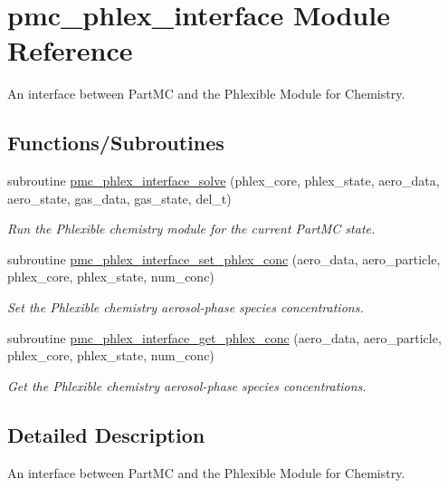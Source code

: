 \hypertarget{namespacepmc__phlex__interface}{}\section{pmc\+\_\+phlex\+\_\+interface Module Reference}
\label{namespacepmc__phlex__interface}


An interface between Part\+MC and the Phlexible Module for Chemistry.  


\subsection*{Functions/\+Subroutines}
\begin{DoxyCompactItemize}
\item 
subroutine \mbox{\hyperlink{namespacepmc__phlex__interface_aa62d09e99d1e6d81cd9ab31e4fec3db4}{pmc\+\_\+phlex\+\_\+interface\+\_\+solve}} (phlex\+\_\+core, phlex\+\_\+state, aero\+\_\+data, aero\+\_\+state, gas\+\_\+data, gas\+\_\+state, del\+\_\+t)
\begin{DoxyCompactList}\small\item\em Run the Phlexible chemistry module for the current Part\+MC state. \end{DoxyCompactList}\item 
subroutine \mbox{\hyperlink{namespacepmc__phlex__interface_a856f9c1fb3526353bd573ab1e4a5ae5f}{pmc\+\_\+phlex\+\_\+interface\+\_\+set\+\_\+phlex\+\_\+conc}} (aero\+\_\+data, aero\+\_\+particle, phlex\+\_\+core, phlex\+\_\+state, num\+\_\+conc)
\begin{DoxyCompactList}\small\item\em Set the Phlexible chemistry aerosol-\/phase species concentrations. \end{DoxyCompactList}\item 
subroutine \mbox{\hyperlink{namespacepmc__phlex__interface_a40607ba7c1278c70d004bbcdef0cc4d1}{pmc\+\_\+phlex\+\_\+interface\+\_\+get\+\_\+phlex\+\_\+conc}} (aero\+\_\+data, aero\+\_\+particle, phlex\+\_\+core, phlex\+\_\+state, num\+\_\+conc)
\begin{DoxyCompactList}\small\item\em Get the Phlexible chemistry aerosol-\/phase species concentrations. \end{DoxyCompactList}\end{DoxyCompactItemize}


\subsection{Detailed Description}
An interface between Part\+MC and the Phlexible Module for Chemistry. 

